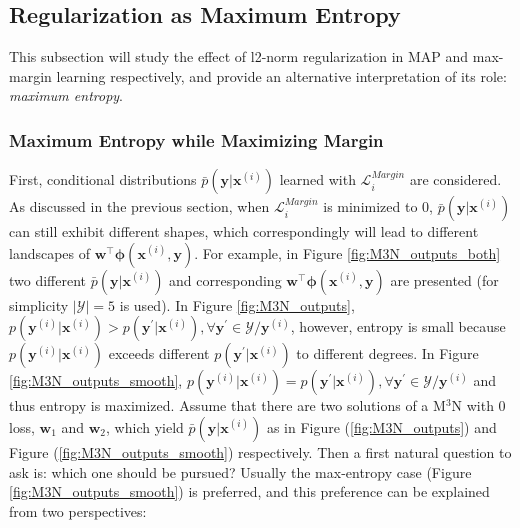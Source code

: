 \subsection{Regularization as Maximum Entropy}
This subsection will study the effect of l2-norm 
regularization in MAP and max-margin learning respectively, and provide an alternative interpretation of its role: \emph{maximum entropy}.

\subsubsection{Maximum Entropy while Maximizing Margin}
First, conditional distributions $\bar p(\mathbf{y}|\mathbf{x}^{(i)})$ learned 
with $\mathcal{L}_i^{Margin}$ are considered. As discussed in the previous section, when $\mathcal{L}_i^{Margin}$ is minimized to 0,       
$\bar p(\mathbf{y}|\mathbf{x}^{(i)})$ can still exhibit different shapes, which correspondingly will lead to different landscapes of 
$\mathbf{w}^\top\boldsymbol{\phi}(\mathbf{x}^{(i)},\mathbf{y})$. For example, in Figure \ref{fig:M3N_outputs_both} two different $\bar p(\mathbf{y}|\mathbf{x}^{(i)})$ and 
corresponding  $\mathbf{w}^\top\boldsymbol{\phi}(\mathbf{x}^{(i)},\mathbf{y})$ are presented (for simplicity $|\mathcal{Y}|=5$ is used).                
In Figure \ref{fig:M3N_outputs}, $p(\mathbf{y}^{(i)}|\mathbf{x}^{(i)})>p(\mathbf{y}^{\prime}|\mathbf{x}^{(i)}),\forall \mathbf{y}^\prime\in \mathcal{Y}/\mathbf{y}^{(i)}$, however, entropy 
is small because $p(\mathbf{y}^{(i)}|\mathbf{x}^{(i)})$ exceeds different $p(\mathbf{y}^{\prime}|\mathbf{x}^{(i)})$ to different degrees. In Figure \ref{fig:M3N_outputs_smooth},    
$p(\mathbf{y}^{(i)}|\mathbf{x}^{(i)})=p(\mathbf{y}^{\prime}|\mathbf{x}^{(i)}),\forall \mathbf{y}^\prime\in \mathcal{Y}/\mathbf{y}^{(i)}$ and thus entropy is maximized.     
Assume that there are two solutions of a M$^3$N with 0 loss, $\mathbf{w}_1$ and $\mathbf{w}_2$, which yield $\bar p(\mathbf{y}|\mathbf{x}^{(i)})$ as in Figure (\ref{fig:M3N_outputs}) and 
Figure (\ref{fig:M3N_outputs_smooth}) respectively. Then a first natural question to ask is: which one should be pursued?    
Usually the max-entropy case (Figure \ref{fig:M3N_outputs_smooth}) is preferred, and this preference can be explained from two perspectives: 
